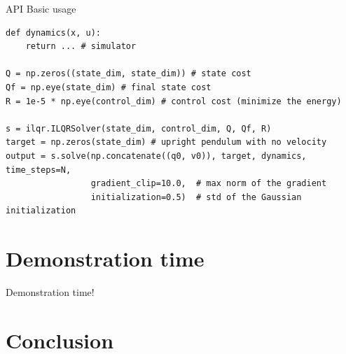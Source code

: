 \documentclass[aspectratio=169]{beamer}
\theoremstyle{definition}
\begin{document}
\begin{frame}[fragile]{API Basic usage}
\begin{verbatim}
def dynamics(x, u):
    return ... # simulator

Q = np.zeros((state_dim, state_dim)) # state cost
Qf = np.eye(state_dim) # final state cost
R = 1e-5 * np.eye(control_dim) # control cost (minimize the energy)

s = ilqr.ILQRSolver(state_dim, control_dim, Q, Qf, R)
target = np.zeros(state_dim) # upright pendulum with no velocity
output = s.solve(np.concatenate((q0, v0)), target, dynamics, time_steps=N, 
                 gradient_clip=10.0,  # max norm of the gradient
                 initialization=0.5)  # std of the Gaussian initialization
\end{verbatim}
\end{frame}

\section{Demonstration time}
\begin{frame}
    \begin{center}
        \huge Demonstration time!
    \end{center}
\end{frame}



\section{Conclusion}
\begin{frame}[allowframebreaks]
    \nocite{*}
    \printbibliography
\end{frame}
\end{document}
